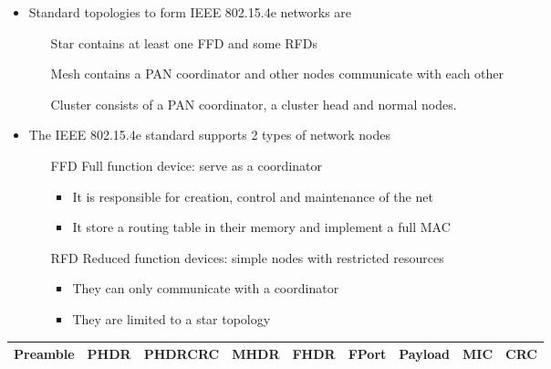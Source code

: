\begin{itemize}
	\item Standard topologies to form IEEE 802.15.4e networks are 
	\begin{itemize}
		\item[Star] contains at least one FFD and some RFDs
		\item[Mesh] contains a PAN coordinator and other nodes communicate with each other
		\item[Cluster] consists of a PAN coordinator, a cluster head and normal nodes.
	\end{itemize}
	\item The IEEE 802.15.4e standard supports 2 types of network nodes
	\begin{itemize}
		\item[FFD] Full function device: serve as a coordinator
		\begin{itemize}
			\item It is responsible for creation, control and maintenance of the net
			\item It store a routing table in their memory and implement a full MAC
		\end{itemize}
		\item[RFD] Reduced function devices: simple nodes with restricted resources
		\begin{itemize}
			\item They can only communicate with a coordinator
			\item They are limited to a star topology
		\end{itemize}
	\end{itemize}
\end{itemize}
\begin{tabulary}{\columnwidth}{|C|C|C|C|C|C|C|C|C|}\hline
	Preamble & PHDR & PHDRCRC & MHDR & FHDR & FPort & Payload & MIC & CRC \\\hline
\end{tabulary}



